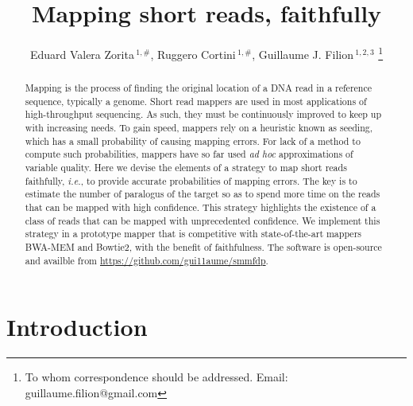 \documentclass[a4,center,fleqn]{NAR}
\begin{document}
\title{Mapping short reads, faithfully}

\author{%
Eduard Valera Zorita\,$^{1,\text{\#}}$,
Ruggero Cortini\,$^{1,\text{\#}}$,
Guillaume J. Filion\,$^{1,2,3}$
\footnote{To whom correspondence should be addressed.
Email: guillaume.filion@gmail.com}}

\address{%
$^{1}$Center for Genomic Regulation (CRG), The Barcelona Institute
of Science and Technology, Dr. Aiguader 88, Barcelona 08003, Spain;
$^{2}$University Pompeu Fabra (UPF), Barcelona, Spain;
$^{3}$present address: Department of Biological Sciences, University
of Toronto Scarborough, Toronto, ON, Canada; $^{\text{\#}}$ equal
contributions.}


\maketitle

\begin{abstract}
Mapping is the process of finding the original location of a DNA read in a
reference sequence, typically a genome. Short read mappers are used in
most applications of high-throughput sequencing. As such, they must be
continuously improved to keep up with increasing needs. To gain speed,
mappers rely on a heuristic known as seeding, which has a small
probability of causing mapping errors. For lack of a method to compute
such probabilities, mappers have so far used \textit{ad hoc}
approximations of variable quality. Here we devise the elements of a
strategy to map short reads faithfully, \textit{i.e.}, to provide accurate
probabilities of mapping errors. The key is to estimate the number of
paralogus of the target so as to spend more time on the reads that can be
mapped with high confidence. This strategy highlights the existence of a
class of reads that can be mapped with unprecedented confidence. We
implement this strategy in a prototype mapper that is competitive with
state-of-the-art mappers BWA-MEM and Bowtie2, with the benefit of
faithfulness. The software is open-source and availble from
\url{https://github.com/gui11aume/smmfdp}.
\end{abstract}


\section{Introduction}
\end{document}
